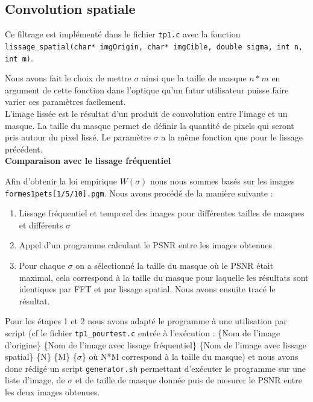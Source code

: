 \documentclass[paper=a4, fontsize=11pt]{scrartcl} %
\begin{document}
\begin{figure}[h!]
\end{figure}

\newpage
\subsection{Convolution spatiale}
Ce filtrage est implémenté dans le fichier \texttt{tp1.c} avec la fonction \texttt{lissage\_spatial(char* imgOrigin, char* imgCible, double sigma, int n, int m)}.

Nous avons fait le choix de mettre $\sigma$ ainsi que la taille de masque $n*m$ en argument de cette fonction dans l'optique qu'un futur utilisateur puisse faire varier ces paramètres facilement.\\

L'image lissée est le résultat d'un produit de convolution entre l'image et un masque. La taille du masque permet de définir la quantité de pixels qui seront pris autour du pixel lissé. Le paramètre $\sigma$ a la même fonction que pour le lissage précédent. \\

\textbf{Comparaison avec le lissage fréquentiel}

Afin d'obtenir la loi empirique $W(\sigma)$ nous nous sommes basés sur les images \texttt{formes1pets[1/5/10].pgm}. Nous avons procédé de la manière suivante :
\begin{enumerate}
\item Lissage fréquentiel et temporel des images pour différentes tailles de masques et différents $\sigma$
\item Appel d'un programme calculant le PSNR entre les images obtenues
\item Pour chaque $\sigma$ on a sélectionné la taille du masque où le PSNR était maximal, cela correspond à la taille du masque pour laquelle les résultats sont identiques par FFT et par lissage spatial. Nous avons ensuite tracé le résultat.
\end{enumerate}
Pour les étapes 1 et 2 nous avons adapté le programme à une utilisation par script (cf le fichier \texttt{tp1\_pourtest.c} entrée à l'exécution : \{Nom de l'image d'origine\} \{Nom de l'image avec lissage fréquentiel\} \{Nom de l'image avec lissage spatial\} \{N\} \{M\} \{$\sigma$\} où N*M correspond à la taille du masque) et nous avons donc rédigé un script \texttt{generator.sh} permettant d'exécuter le programme sur une liste d'image, de $\sigma$ et de taille de masque donnée puis de mesurer le PSNR entre les deux images obtenues. 
\end{document}
